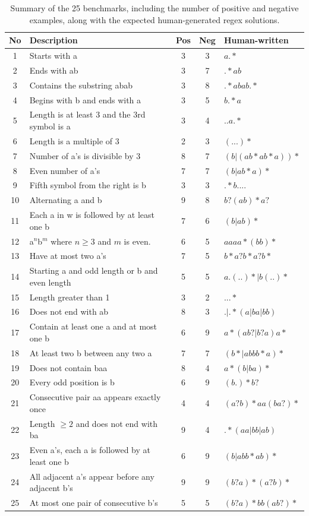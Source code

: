 \begin{table}[h!]
	\centering
	\label{tab:alpha_regex_benchmarks_summary}
	\caption{Summary of the 25 benchmarks, including the number of positive and negative examples, along with the expected human-generated regex solutions.}
	\begin{tabular}{|c|l|c|c|l|}
	\hline
	\textbf{No} & \textbf{Description} & \textbf{Pos} & \textbf{Neg} & \textbf{Human-written} \\
	\hline
	1 & Starts with a & 3 & 3 & $a.*$ \\
	2 & Ends with ab & 3 & 7 & $.*ab$ \\
	3 & Contains the substring abab & 3 & 8 & $.*abab.*$ \\
	4 & Begins with b and ends with a & 3 & 5 & $b.*a$ \\
	5 & Length is at least 3 and the 3rd symbol is a & 3 & 4 & $..a.*$ \\
	6 & Length is a multiple of 3 & 2 & 3 & $(...)*$ \\
	7 & Number of a's is divisible by 3 & 8 & 7 & $(b|(ab*ab*a))*$ \\
	8 & Even number of a's & 7 & 7 & $(b|ab*a)*$ \\
	9 & Fifth symbol from the right is b & 3 & 3 & $.*b....$ \\
	10 & Alternating a and b & 9 & 8 & $b?(ab)*a?$ \\
	11 & Each a in w is followed by at least one b & 7 & 6 & $(b|ab)*$ \\
	12 & a$^n$b$^m$ where $n \geq 3$ and $m$ is even. & 6 & 5 & $aaaa*(bb)*$ \\
	13 & Have at most two a's & 7 & 5 & $b*a?b*a?b*$ \\
	14 & Starting a and odd length or b and even length & 5 & 5 & $a.(..)*|b(..)*$ \\
	15 & Length greater than 1 & 3 & 2 & $...*$ \\
	16 & Does not end with ab & 8 & 3 & $.|.*(a|ba|bb)$ \\
	17 & Contain at least one a and at most one b & 6 & 9 & $a*(ab?|b?a)a*$ \\
	18 & At least two b between any two a & 7 & 7 & $(b*|abbb*a)*$ \\
	19 & Does not contain baa & 8 & 4 & $a*(b|ba)*$ \\
	20 & Every odd position is b & 6 & 9 & $(b.)*b?$ \\
	21 & Consecutive pair aa appears exactly once & 4 & 4 & $(a?b)*aa(ba?)*$ \\
	22 & Length $\ge 2$ and does not end with ba & 9 & 4 & $.*(aa|bb|ab)$ \\
	23 & Even a's, each a is followed by at least one b & 6 & 9 & $(b|abb*ab)*$ \\
	24 & All adjacent a's appear before any adjacent b's & 9 & 9 & $(b?a)*(a?b)*$ \\
	25 & At most one pair of consecutive b's & 5 & 5 & $(b?a)*bb(ab?)*$ \\
	\hline
\end{tabular}
\end{table}



